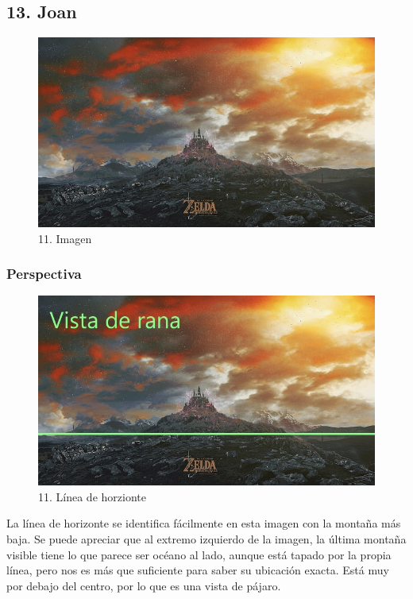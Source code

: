 \documentclass[12pt]{article}
\begin{document}

    \subsection{13. Joan}
        \begin{figure}[H]
          \centering
          \includegraphics[width=\textwidth]{images/Concepts/13_concept_art.jpg}
          \caption{\small 11. Imagen}
        \end{figure}

            \subsubsection{Perspectiva}
            \begin{figure}[H]
          \centering
          \includegraphics[width=\textwidth]{images/Joan/Sección 13/Imagen 13_Línea Horizonte.jpg}
          \caption{\small 11. Línea de horzionte}
        \end{figure}
        La línea de horizonte se identifica fácilmente en esta imagen con la montaña más baja. Se puede apreciar que al extremo izquierdo de la imagen, la última montaña visible tiene lo que parece ser océano al lado, aunque está tapado por la propia línea, pero nos es más que suficiente para saber su ubicación exacta. Está muy por debajo del centro, por lo que es una vista de pájaro. 
\end{document}
